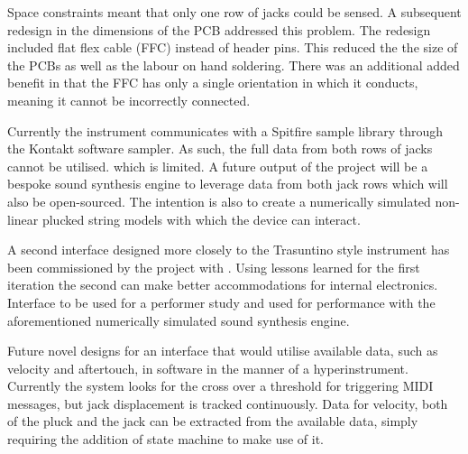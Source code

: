 
Space constraints meant that only one row of jacks could be sensed. A subsequent redesign in the dimensions of the PCB addressed this problem.
The redesign included flat flex cable (FFC) instead of header pins. This reduced the the size of the PCBs as well as the labour on hand soldering.
There was an additional added benefit in that the FFC has only a single orientation in which it conducts, meaning it cannot be incorrectly connected.

Currently the instrument communicates with a Spitfire sample library through the Kontakt software sampler. As such, the full data from both rows of jacks cannot be utilised. which is limited. A future output of the  project will be a bespoke sound synthesis engine to leverage data from both jack rows
which will also be open-sourced. The intention is also to create a numerically simulated non-linear plucked string models with which the device can interact. 


A second interface designed more closely to the Trasuntino style instrument has been commissioned by the  project with . 
Using lessons learned for the first iteration the second can make better accommodations for internal electronics. Interface to be used for a performer study and used for performance with the aforementioned numerically simulated sound synthesis engine.

Future novel designs for an interface that would utilise available data, such as velocity and aftertouch, in software in the manner of a hyperinstrument.
Currently the system looks for the cross over a threshold for triggering MIDI messages, but jack displacement is tracked continuously. Data for velocity, both of the pluck and the jack can be extracted from the available data, simply requiring the addition of state machine to make use of it.

